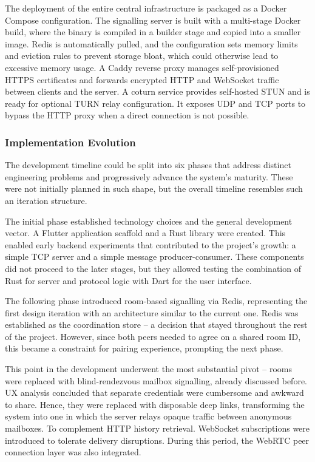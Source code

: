 \documentclass[12pt,a4paper]{article}
\begin{document}
The deployment of the entire central infrastructure is packaged as a Docker Compose configuration. The signalling server is built with a multi-stage Docker build, where the binary is compiled in a builder stage and copied into a smaller image. Redis is automatically pulled, and the configuration sets memory limits and eviction rules to prevent storage bloat, which could otherwise lead to excessive memory usage. A Caddy reverse proxy manages self-provisioned HTTPS certificates and forwards encrypted HTTP and WebSocket traffic between clients and the server. A coturn service provides self-hosted STUN and is ready for optional TURN relay configuration. It exposes UDP and TCP ports to bypass the HTTP proxy when a direct connection is not possible.

\subsubsection{Implementation Evolution}

The development timeline could be split into six phases that address distinct engineering problems and progressively advance the system’s maturity. These were not initially planned in such shape, but the overall timeline resembles such an iteration structure.

The initial phase established technology choices and the general development vector. A Flutter application scaffold and a Rust library were created. This enabled early backend experiments that contributed to the project’s growth: a simple TCP server and a simple message producer-consumer. These components did not proceed to the later stages, but they allowed testing the combination of Rust for server and protocol logic with Dart for the user interface.

The following phase introduced room-based signalling via Redis, representing the first design iteration with an architecture similar to the current one. Redis was established as the coordination store – a decision that stayed throughout the rest of the project. However, since both peers needed to agree on a shared room ID, this became a constraint for pairing experience, prompting the next phase.

This point in the development underwent the most substantial pivot – rooms were replaced with blind-rendezvous mailbox signalling, already discussed before. UX analysis concluded that separate credentials were cumbersome and awkward to share. Hence, they were replaced with disposable deep links, transforming the system into one in which the server relays opaque traffic between anonymous mailboxes. To complement HTTP history retrieval. WebSocket subscriptions were introduced to tolerate delivery disruptions. During this period, the WebRTC peer connection layer was also integrated.
\end{document}
